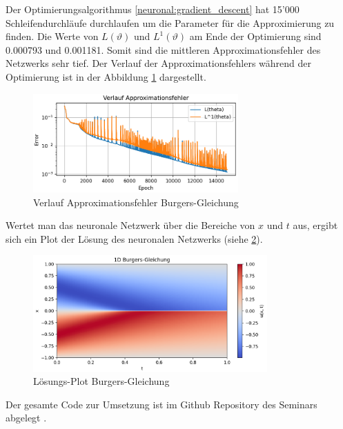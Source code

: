 Der Optimierungsalgorithmus \ref{neuronal:gradient_descent} hat 15'000 Schleifendurchläufe durchlaufen um die Parameter für die Approximierung zu finden.
Die Werte von $L(\vartheta)$ und $L^1(\vartheta)$ am Ende der Optimierung sind 0.000793 und 0.001181.
Somit sind die mittleren Approximationsfehler des Netzwerks sehr tief.
Der Verlauf der Approximationsfehlers während der Optimierung ist in der Abbildung \ref{fig:fehler_burgers} dargestellt.

\begin{figure}
    \centering
    \hspace*{-0.1\textwidth}
    \includegraphics[width=0.7\textwidth]{papers/neuronal/images/approximation_error_burgers.png}
    \caption{Verlauf Approximationsfehler Burgers-Gleichung}
    \label{fig:fehler_burgers}
\end{figure}

Wertet man das neuronale Netzwerk über die Bereiche von $x$ und $t$ aus, ergibt sich ein Plot der Lösung des neuronalen Netzwerks (siehe \ref{fig:loesung_burgers}).

\begin{figure}
    \centering
    \includegraphics[width=0.8\textwidth]{papers/neuronal/images/prediction_burgers_net.png}
    \caption{Lösungs-Plot Burgers-Gleichung}
    \label{fig:loesung_burgers}
\end{figure}

Der gesamte Code zur Umsetzung ist im Github Repository des Seminars abgelegt \cite{neuronal:github_source_code}.
